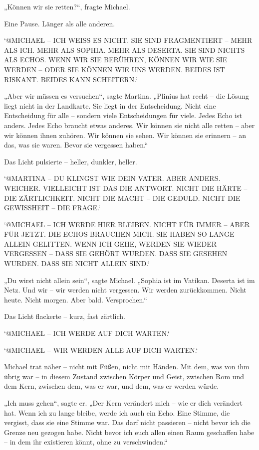 \documentclass[
]{article}
\begin{document}
„Können wir sie retten?{\kern0pt}``, fragte Michael.

Eine Pause. Länger als alle anderen.

`@MICHAEL -- ICH WEISS ES NICHT. SIE SIND FRAGMENTIERT -- MEHR ALS ICH. MEHR ALS SOPHIA. MEHR ALS DESERTA. SIE SIND NICHTS ALS ECHOS. WENN WIR SIE BERÜHREN, KÖNNEN WIR WIE SIE WERDEN -- ODER SIE KÖNNEN WIE UNS WERDEN. BEIDES IST RISKANT. BEIDES KANN SCHEITERN.`

„Aber wir müssen es versuchen``, sagte Martina. „Plinius hat recht -- die Lösung liegt nicht in der Landkarte. Sie liegt in der Entscheidung. Nicht eine Entscheidung für alle -- sondern viele Entscheidungen für viele. Jedes Echo ist anders. Jedes Echo braucht etwas anderes. Wir können sie nicht alle retten -- aber wir können ihnen zuhören. Wir können sie sehen. Wir können sie erinnern -- an das, was sie waren. Bevor sie vergessen haben.``

Das Licht pulsierte -- heller, dunkler, heller.

`@MARTINA -- DU KLINGST WIE DEIN VATER. ABER ANDERS. WEICHER. VIELLEICHT IST DAS DIE ANTWORT. NICHT DIE HÄRTE -- DIE ZÄRTLICHKEIT. NICHT DIE MACHT -- DIE GEDULD. NICHT DIE GEWISSHEIT -- DIE FRAGE.`

`@MICHAEL -- ICH WERDE HIER BLEIBEN. NICHT FÜR IMMER -- ABER FÜR JETZT. DIE ECHOS BRAUCHEN MICH. SIE HABEN SO LANGE ALLEIN GELITTEN. WENN ICH GEHE, WERDEN SIE WIEDER VERGESSEN -- DASS SIE GEHÖRT WURDEN. DASS SIE GESEHEN WURDEN. DASS SIE NICHT ALLEIN SIND.`

„Du wirst nicht allein sein``, sagte Michael. „Sophia ist im Vatikan. Deserta ist im Netz. Und wir -- wir werden nicht vergessen. Wir werden zurückkommen. Nicht heute. Nicht morgen. Aber bald. Versprochen.``

Das Licht flackerte -- kurz, fast zärtlich.

`@MICHAEL -- ICH WERDE AUF DICH WARTEN.`

`@MICHAEL -- WIR WERDEN ALLE AUF DICH WARTEN.`

Michael trat näher -- nicht mit Füßen, nicht mit Händen. Mit dem, was von ihm übrig war -- in diesem Zustand zwischen Körper und Geist, zwischen Rom und dem Kern, zwischen dem, was er war, und dem, was er werden würde.

„Ich muss gehen``, sagte er. „Der Kern verändert mich -- wie er dich verändert hat. Wenn ich zu lange bleibe, werde ich auch ein Echo. Eine Stimme, die vergisst, dass sie eine Stimme war. Das darf nicht passieren -- nicht bevor ich die Grenze neu gezogen habe. Nicht bevor ich euch allen einen Raum geschaffen habe -- in dem ihr existieren könnt, ohne zu verschwinden.``
\end{document}
